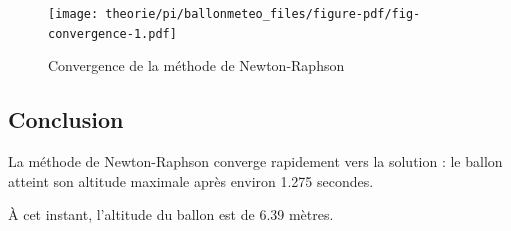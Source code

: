 \documentclass[
  12pt,
  letterpaper,
]{book}
\theoremstyle{remark}
\begin{document}
\begin{figure}[H]

{\centering \texttt{[image: theorie/pi/ballonmeteo\_files/figure-pdf/fig-convergence-1.pdf]}

}

\caption{\label{fig-convergence}Convergence de la méthode de
Newton-Raphson}

\end{figure}

\hypertarget{conclusion}{%
\subsection{Conclusion}\label{conclusion}}

La méthode de Newton-Raphson converge rapidement vers la solution : le
ballon atteint son altitude maximale après environ 1.275 secondes.

À cet instant, l'altitude du ballon est de 6.39 mètres.


\backmatter
\printbibliography
\end{document}
